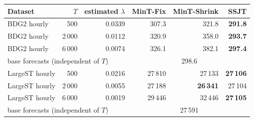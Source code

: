 \small
\begin{tabular}{l r r rrr}
\toprule
Dataset & $T$ & estimated $\lambda$ & MinT-Fix & MinT-Shrink & SSJT\\
\midrule
BDG2 hourly & 500 & 0.0339 & 307.3 & 321.8 & \textbf{291.8}\\
BDG2 hourly & 2\,000 & 0.0112 & 320.9 & 358.0 & \textbf{293.7}\\
BDG2 hourly & 6\,000 & 0.0074 & 326.1 & 382.1 & \textbf{297.4}\\
\multicolumn{3}{l}{\quad base forecasts (independent of $T$)} & \multicolumn{3}{c}{298.6}\\
\midrule
LargeST hourly & 500 & 0.0216 & 27\,810 & 27\,133 & \textbf{27\,106}\\
LargeST hourly & 2\,000 & 0.0055 & 27\,188 & \textbf{26\,341} & 27\,104\\
LargeST hourly & 6\,000 & 0.0019 & 29\,446 & 32\,446 & \textbf{27\,105}\\
\multicolumn{3}{l}{\quad base forecasts (independent of $T$)} & \multicolumn{3}{c}{27\,591}\\
\bottomrule
\end{tabular}
